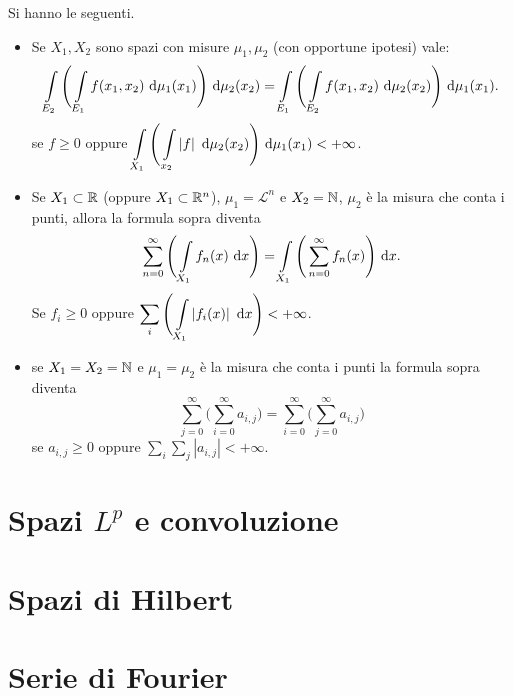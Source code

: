 \documentclass[a4paper, 12pt]{report}
\begin{document}
\begin{osservazione}
Si hanno le seguenti.
\begin{itemize}
	\item Se $X_1, X_2$ sono spazi con misure $\mu_1,\mu_2$ (con opportune ipotesi) vale:
	\[
		\int\limits_{\mathclap{E_2}}^{} \Bigg( \int\limits_{\mathclap{E_1}}^{} f(x_1,x_2) \, \dd \mu_1(x_1)  \Bigg) \, \dd \mu_2(x_2) = \int\limits_{\mathclap{E_1}}^{} \Bigg( \int\limits_{\mathclap{E_2}}^{} f(x_1,x_2) \, \dd \mu_2(x_2)  \Bigg) \, \dd \mu_1(x_1).
	\] 
	se $f\geq 0$ oppure $\displaystyle \int\limits_{\mathclap{X_1}}^{} \Bigg( \int\limits_{\mathclap{x_2}}^{} \left| f \right| \, \dd \mu_2(x_2)  \Bigg) \, \dd \mu_1(x_1) < + \infty $.
	\item Se $X_1 \subset \mathbb R$ (oppure $X_1 \subset \mathbb R^n$), $\mu_1 = \mathscr L^n$ e $X_2 = \mathbb N$, $\mu_2$ è la misura che conta i punti, allora la formula sopra diventa
	\[
		\sum_{n=0}^{\infty} \Bigg( \int\limits_{\mathclap{X_1}}^{} f_n(x) \, \dd x  \Bigg) = \int\limits_{\mathclap{X_1}}^{} \Bigg( \sum_{n=0}^{\infty} f_n(x)  \Bigg) \, \dd x.
	\] 
	Se $f_i \geq 0$ oppure $\displaystyle \sum_{i} \Bigg( \int\limits_{\mathclap{X_1}}^{} \left| f_i(x) \right| \, \dd x  \Bigg) < + \infty $.
	\item se $X_1 = X_2 = \mathbb N$ e $\mu_1 = \mu_2$ è la misura che conta i punti la formula sopra diventa
	\[
		\sum_{j=0}^{\infty} \Bigg( \sum_{i=0}^{\infty} a_{i,j}  \Bigg) = \sum_{i=0}^{\infty} \Bigg( \sum_{j=0}^{\infty} a_{i,j}  \Bigg)
	\] 
	se $a_{i,j} \geq 0$ oppure $\sum_{i} \sum_{j} \left| a_{i,j} \right| < +\infty $.
\end{itemize}
\end{osservazione}







\chapter{Spazi $L^p$ e convoluzione}


\chapter{Spazi di Hilbert}


\chapter{Serie di Fourier}
\end{document}
